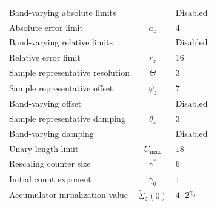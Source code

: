 \begin{table}[p!]
\begin{tabular}{lcl}
		Band-varying absolute limits     &                              & Disabled               \\
		Absolute error limit             & $a_z$                        & 4                      \\
		Band-varying relative limits     &                              & Disabled               \\
		Relative error limit             & $r_z$                        & 16                     \\
		Sample representative resolution & $\Theta$                     & $3$                    \\
		Sample representative offset     & $\psi_z$                     & $7$                    \\
		Band-varying offset              &                              & Disabled               \\
		Sample representative damping    & $\theta_z$                   & $3$                    \\
		Band-varying damping             &                              & Disabled               \\
		Unary length limit               & $U_{\max}$                   & $18$                   \\
		Rescaling counter size           & $\gamma^{*}$                 & $6$                    \\
		Initial count exponent           & $\gamma_0$                   & $1$                    \\
		Accumulator initialization value & $\tilde{\Sigma}_z(0)$        & $4 \cdot 2^{\gamma_0}$ \\
		\bottomrule
	\end{tabular}
\end{table}

